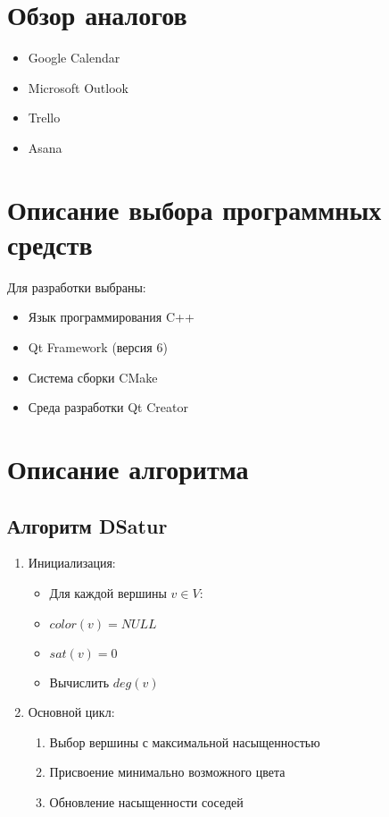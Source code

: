 \documentclass[a4paper,12pt]{article}
\begin{document}
\section*{Обзор аналогов}
\begin{itemize}
    \item Google Calendar
    \item Microsoft Outlook
    \item Trello
    \item Asana
\end{itemize}

\section*{Описание выбора программных средств}
Для разработки выбраны:
\begin{itemize}
    \item Язык программирования C++
    \item Qt Framework (версия 6)
    \item Система сборки CMake
    \item Среда разработки Qt Creator
\end{itemize}

\section*{Описание алгоритма}
\subsection*{Алгоритм DSatur}
\begin{enumerate}
    \item Инициализация:
    \begin{itemize}
        \item Для каждой вершины $v \in V$:
        \item $color(v) = NULL$
        \item $sat(v) = 0$
        \item Вычислить $deg(v)$
    \end{itemize}
    
    \item Основной цикл:
    \begin{enumerate}
        \item Выбор вершины с максимальной насыщенностью
        \item Присвоение минимально возможного цвета
        \item Обновление насыщенности соседей
    \end{enumerate}
\end{enumerate}
\end{document}
